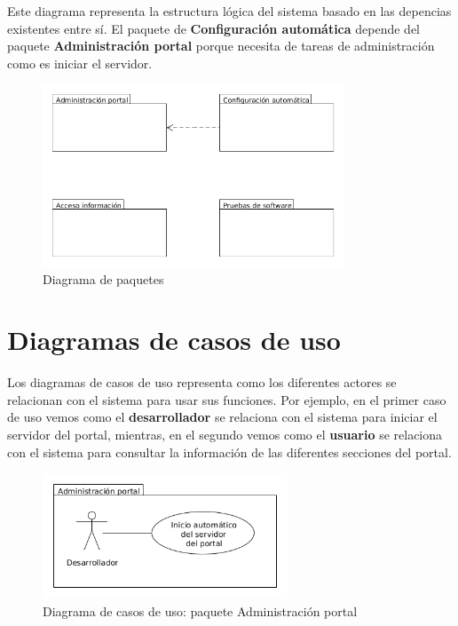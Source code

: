 Este diagrama representa la estructura lógica del sistema basado en las depencias existentes entre sí. El paquete de \textbf{Configuración automática} depende del paquete \textbf{Administración portal} porque necesita de tareas de administración como es iniciar el servidor.

\begin{figure}[!ht]
  \begin{center}
  \includegraphics[width=0.8\textwidth]{../images/diagrama_paquetes.png}
  \caption{Diagrama de paquetes}
  \label{fig:diag_paquetes}
  \end{center}
\end{figure}
 
\section{Diagramas de casos de uso}

Los diagramas de casos de uso representa como los diferentes actores se relacionan con el sistema para usar sus funciones. Por ejemplo, en el primer caso de uso vemos como el \textbf{desarrollador} se relaciona con el sistema para iniciar el servidor del portal, mientras, en el segundo vemos como el \textbf{usuario} se relaciona con el sistema para consultar la información de las diferentes secciones del portal.

\begin{figure}[!ht]
  \begin{center}
  \includegraphics[width=0.65\textwidth]{../images/diag_cu_ap.png}
  \caption{Diagrama de casos de uso: paquete Administración portal}
  \label{fig:diag_cu_ap}
  \end{center}
\end{figure}

